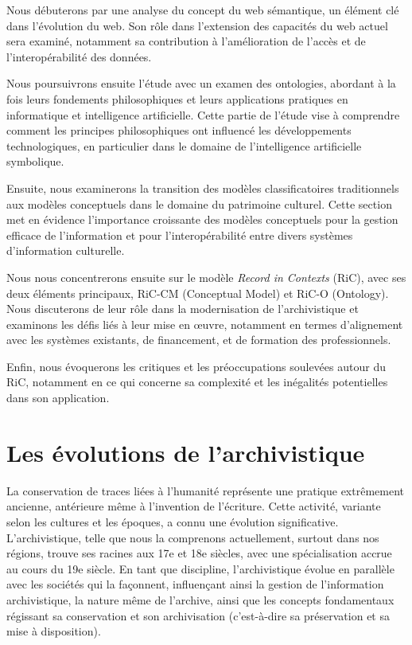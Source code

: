 \documentclass[12pt]{report}
\begin{document}
Nous débuterons par une analyse du concept du web sémantique, un élément clé dans l'évolution du web. Son rôle dans l'extension des capacités du web actuel sera examiné, notamment sa contribution à l'amélioration de l'accès et de l'interopérabilité des données.

Nous poursuivrons ensuite l'étude avec un examen des ontologies, abordant à la fois leurs fondements philosophiques et leurs applications pratiques en informatique et intelligence artificielle. Cette partie de l'étude vise à comprendre comment les principes philosophiques ont influencé les développements technologiques, en particulier dans le domaine de l'intelligence artificielle symbolique.

Ensuite, nous examinerons la transition des modèles classificatoires traditionnels aux modèles conceptuels dans le domaine du patrimoine culturel. Cette section met en évidence l'importance croissante des modèles conceptuels pour la gestion efficace de l'information et pour l'interopérabilité entre divers systèmes d'information culturelle.

Nous nous concentrerons ensuite sur le modèle \textit{Record in Contexts} (RiC), avec ses deux éléments principaux, RiC-CM (Conceptual Model) et RiC-O (Ontology). Nous discuterons de leur rôle dans la modernisation de l'archivistique et examinons les défis liés à leur mise en œuvre, notamment en termes d'alignement avec les systèmes existants, de financement, et de formation des professionnels.

Enfin, nous évoquerons les critiques et les préoccupations soulevées autour du RiC, notamment en ce qui concerne sa complexité et les inégalités potentielles dans son application.

\newpage
\chapter{Les évolutions de l'archivistique}
La conservation de traces liées à l'humanité représente une pratique extrêmement ancienne, antérieure même à l'invention de l'écriture. Cette activité, variante selon les cultures et les époques, a connu une évolution significative. L'archivistique, telle que nous la comprenons actuellement, surtout dans nos régions, trouve ses racines aux 17e et 18e siècles, avec une spécialisation accrue au cours du 19e siècle. En tant que discipline, l'archivistique évolue en parallèle avec les sociétés qui la façonnent, influençant ainsi la gestion de l'information archivistique, la nature même de l'archive, ainsi que les concepts fondamentaux régissant sa conservation et son archivisation (c'est-à-dire sa préservation et sa mise à disposition).
\end{document}
